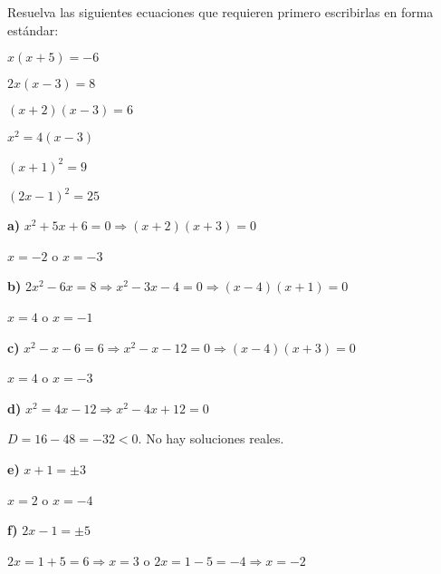 \begin{exercise}
\problem Resuelva las siguientes ecuaciones que requieren primero escribirlas en forma estándar:

\begin{exerciselist}
    \item $x(x + 5) = -6$
    \item $2x(x - 3) = 8$
    \item $(x + 2)(x - 3) = 6$
    \item $x^2 = 4(x - 3)$
    \item $(x + 1)^2 = 9$
    \item $(2x - 1)^2 = 25$
\end{exerciselist}

\begin{solucion}
\textbf{a)} $x^2 + 5x + 6 = 0 \Rightarrow (x + 2)(x + 3) = 0$

$x = -2$ o $x = -3$

\textbf{b)} $2x^2 - 6x = 8 \Rightarrow x^2 - 3x - 4 = 0 \Rightarrow (x - 4)(x + 1) = 0$

$x = 4$ o $x = -1$

\textbf{c)} $x^2 - x - 6 = 6 \Rightarrow x^2 - x - 12 = 0 \Rightarrow (x - 4)(x + 3) = 0$

$x = 4$ o $x = -3$

\textbf{d)} $x^2 = 4x - 12 \Rightarrow x^2 - 4x + 12 = 0$

$D = 16 - 48 = -32 < 0$. No hay soluciones reales.

\textbf{e)} $x + 1 = \pm 3$

$x = 2$ o $x = -4$

\textbf{f)} $2x - 1 = \pm 5$

$2x = 1 + 5 = 6 \Rightarrow x = 3$ o $2x = 1 - 5 = -4 \Rightarrow x = -2$
\end{solucion}
\end{exercise}

